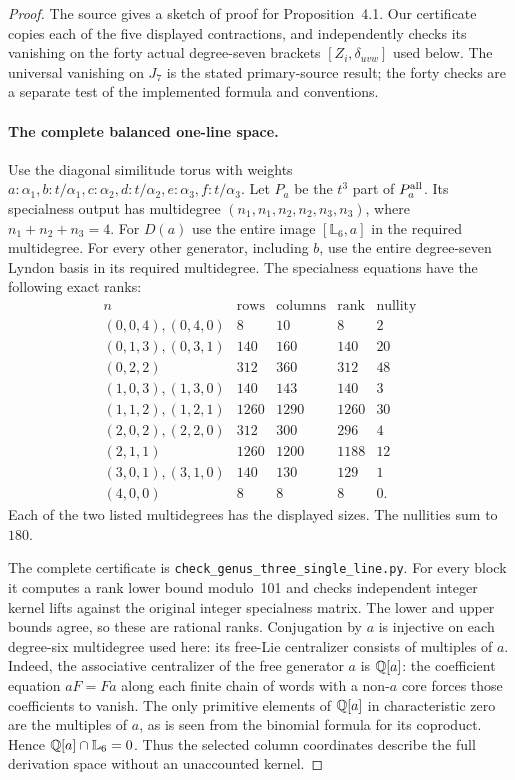 \begin{proof}
The source gives a sketch of proof for Proposition~4.1. Our certificate
copies each of the five displayed contractions, and independently
checks its vanishing on the forty actual degree-seven brackets
$[Z_i,\delta_{uvw}]$ used below. The universal vanishing on $J_7$
is the stated primary-source result; the forty checks are a separate
test of the implemented formula and conventions.

\paragraph{The complete balanced one-line space.}
Use the diagonal similitude torus with weights
$a:\alpha_1,b:t/\alpha_1,c:\alpha_2,d:t/\alpha_2,
e:\alpha_3,f:t/\alpha_3$. Let $P_a$ be the $t^3$ part of
$P_a^{\rm all}$. Its specialness output has multidegree
$(n_1,n_1,n_2,n_2,n_3,n_3)$, where $n_1+n_2+n_3=4$.
For $D(a)$ use the entire image $[\mathbb L_6,a]$ in the
required multidegree. For every other generator, including $b$,
use the entire degree-seven Lyndon basis in its required multidegree.
The specialness equations have the following exact ranks:
\[
\begin{array}{c|r|r|r|r}
n&\text{rows}&\text{columns}&\text{rank}&\text{nullity}\\\hline
(0,0,4),(0,4,0)&8&10&8&2\\
(0,1,3),(0,3,1)&140&160&140&20\\
(0,2,2)&312&360&312&48\\
(1,0,3),(1,3,0)&140&143&140&3\\
(1,1,2),(1,2,1)&1260&1290&1260&30\\
(2,0,2),(2,2,0)&312&300&296&4\\
(2,1,1)&1260&1200&1188&12\\
(3,0,1),(3,1,0)&140&130&129&1\\
(4,0,0)&8&8&8&0.
\end{array}                                                   \tag{SL.5}
\]
Each of the two listed multidegrees has the displayed sizes.
The nullities sum to $180$.

The complete certificate is
\texttt{check\_genus\_three\_}\allowbreak\texttt{single\_line.py}.
For every block it computes a rank lower bound modulo~101 and
checks independent integer kernel lifts against the original
integer specialness matrix. The lower and upper bounds agree,
so these are rational ranks. Conjugation by $a$ is injective on
each degree-six multidegree used here: its free-Lie centralizer
consists of multiples of $a$. Indeed, the associative centralizer
of the free generator $a$ is $\mathbb Q[a]$: the coefficient equation
$aF=Fa$ along each finite chain of words with a non-$a$ core
forces those coefficients to vanish. The only primitive elements
of $\mathbb Q[a]$ in characteristic zero are the multiples of $a$,
as is seen from the binomial formula for its coproduct.
Hence $\mathbb Q[a]\cap\mathbb L_6=0$. Thus the selected column coordinates
describe the full derivation space without an unaccounted kernel.


\end{proof}
